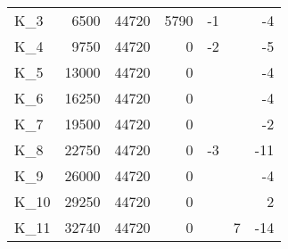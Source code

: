 \begin{tabular}{lrrrllr}
K\_3 & 6500 & 44720 & 5790 & -1 &  & -4 \\
K\_4 & 9750 & 44720 & 0 & -2 &  & -5 \\
K\_5 & 13000 & 44720 & 0 &  &  & -4 \\
K\_6 & 16250 & 44720 & 0 &  &  & -4 \\
K\_7 & 19500 & 44720 & 0 &  &  & -2 \\
K\_8 & 22750 & 44720 & 0 & -3 &  & -11 \\
K\_9 & 26000 & 44720 & 0 &  &  & -4 \\
K\_10 & 29250 & 44720 & 0 &  &  & 2 \\
K\_11 & 32740 & 44720 & 0 &  & 7 & -14 \\
\bottomrule
\end{tabular}
